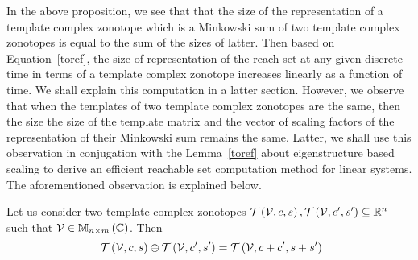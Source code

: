 In the above proposition, we see that that the size of the
representation of a template complex zonotope which is a Minkowski sum
of two template complex zonotopes is equal to the sum of the sizes of
latter.  Then based on Equation~\ref{toref}, the size of
representation of the reach set at any given discrete time in terms of
a template complex zonotope increases linearly as a function of time.
We shall explain this computation in a latter section.  However, we
observe that when the templates of two template complex zonotopes are
the same, then the size the size of the template matrix and the vector
of scaling factors of the representation of their Minkowski sum
remains the same.  Latter, we shall use this observation in
conjugation with the Lemma~\ref{toref} about eigenstructure based scaling
to derive an efficient reachable set computation method for linear
systems.  The aforementioned observation is explained below.
%
\begin{lemma}
Let us consider two template complex zonotopes
$\mathit{\operatorname{\mathcal{T}}}\left(\mathcal{V},c,s\right),\mathit{\operatorname{\mathcal{T}}}\left(\mathcal{V},c^\prime,s^\prime\right)\subseteq\mathbb{R}^n$
such that
$\mathcal{V}\in\mathbb{M}_{n\times m}\left(\mathbb{C}\right)$.  Then
%
\begin{equation}~\label{eqn:common-minkowski}
\mathit{\operatorname{\mathcal{T}}}\left(\mathcal{V},c,s\right)\oplus \mathit{\operatorname{\mathcal{T}}}\left(\mathcal{V},c^\prime,s^\prime\right)=\mathit{\operatorname{\mathcal{T}}}\left(\mathcal{V},c+c^\prime,s+s^\prime\right)
\end{equation}
%
\end{lemma}
%
